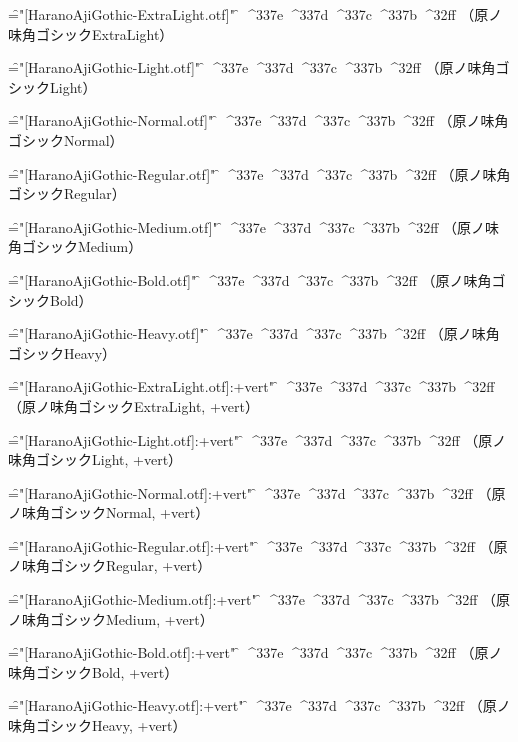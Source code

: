 
\nopagenumbers

\font\f="[HaranoAjiGothic-ExtraLight.otf]" \f
^^^^337e
^^^^337d
^^^^337c
^^^^337b
^^^^32ff
（原ノ味角ゴシックExtraLight）\par

\font\f="[HaranoAjiGothic-Light.otf]" \f
^^^^337e
^^^^337d
^^^^337c
^^^^337b
^^^^32ff
（原ノ味角ゴシックLight）\par

\font\f="[HaranoAjiGothic-Normal.otf]" \f
^^^^337e
^^^^337d
^^^^337c
^^^^337b
^^^^32ff
（原ノ味角ゴシックNormal）\par

\font\f="[HaranoAjiGothic-Regular.otf]" \f
^^^^337e
^^^^337d
^^^^337c
^^^^337b
^^^^32ff
（原ノ味角ゴシックRegular）\par

\font\f="[HaranoAjiGothic-Medium.otf]" \f
^^^^337e
^^^^337d
^^^^337c
^^^^337b
^^^^32ff
（原ノ味角ゴシックMedium）\par

\font\f="[HaranoAjiGothic-Bold.otf]" \f
^^^^337e
^^^^337d
^^^^337c
^^^^337b
^^^^32ff
（原ノ味角ゴシックBold）\par

\font\f="[HaranoAjiGothic-Heavy.otf]" \f
^^^^337e
^^^^337d
^^^^337c
^^^^337b
^^^^32ff
（原ノ味角ゴシックHeavy）\par


\font\f="[HaranoAjiGothic-ExtraLight.otf]:+vert" \f
^^^^337e
^^^^337d
^^^^337c
^^^^337b
^^^^32ff
（原ノ味角ゴシックExtraLight, +vert）\par

\font\f="[HaranoAjiGothic-Light.otf]:+vert" \f
^^^^337e
^^^^337d
^^^^337c
^^^^337b
^^^^32ff
（原ノ味角ゴシックLight, +vert）\par

\font\f="[HaranoAjiGothic-Normal.otf]:+vert" \f
^^^^337e
^^^^337d
^^^^337c
^^^^337b
^^^^32ff
（原ノ味角ゴシックNormal, +vert）\par

\font\f="[HaranoAjiGothic-Regular.otf]:+vert" \f
^^^^337e
^^^^337d
^^^^337c
^^^^337b
^^^^32ff
（原ノ味角ゴシックRegular, +vert）\par

\font\f="[HaranoAjiGothic-Medium.otf]:+vert" \f
^^^^337e
^^^^337d
^^^^337c
^^^^337b
^^^^32ff
（原ノ味角ゴシックMedium, +vert）\par

\font\f="[HaranoAjiGothic-Bold.otf]:+vert" \f
^^^^337e
^^^^337d
^^^^337c
^^^^337b
^^^^32ff
（原ノ味角ゴシックBold, +vert）\par

\font\f="[HaranoAjiGothic-Heavy.otf]:+vert" \f
^^^^337e
^^^^337d
^^^^337c
^^^^337b
^^^^32ff
（原ノ味角ゴシックHeavy, +vert）\par

\bye
